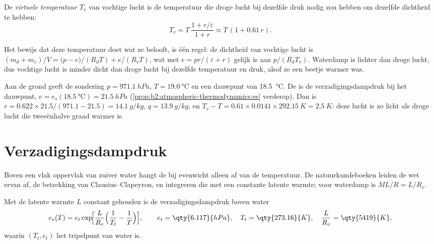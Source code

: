 \begin{definition}\label{def:b2:atmospheric-thermodynamics:virtual}
De \emph{virtuele temperatuur} $T_v$ van vochtige lucht is de temperatuur
die droge lucht bij dezelfde druk nodig zou hebben om dezelfde dichtheid te hebben:
\[
  T_v = T\,\frac{1 + r/\varepsilon}{1 + r} \approx T\,(1 + 0.61\,r) .
\]
\end{definition}

Het bewijs dat deze temperatuur doet wat ze belooft, is één regel: de dichtheid van vochtige lucht is
$(m_d + m_v)/V = \bigl(p - e\bigr)/(R_dT) + e/(R_vT)$, wat met $e = pr/(\varepsilon + r)$
gelijk is aan $p/(R_dT_v)$. Waterdamp is lichter dan droge lucht, dus vochtige lucht is minder dicht dan droge
lucht bij dezelfde temperatuur en druk, alsof ze een beetje warmer was.

\begin{example}\label{ex:b2:atmospheric-thermodynamics:norman}
Aan de grond geeft de sondering $p = \qty{971.1}{hPa}$, $T = \qty{19.0}{\celsius}$ en een dauwpunt
van \qty{18.5}{\celsius}. De  is de verzadigingsdampdruk bij het
dauwpunt, $e = e_s(\qty{18.5}{\celsius}) = \qty{21.5}{hPa}$ (\cref{prop:b2:atmospheric-thermodynamics:es}
verderop). Dan is $r = 0.622 \times 21.5/(971.1 - 21.5) = \qty{14.1}{g/kg}$, $q = \qty{13.9}{g/kg}$,
en $T_v - T = 0.61 \times 0.0141 \times \qty{292.15}{K} = \qty{2.5}{K}$: deze lucht is zo licht als
droge lucht die tweeënhalve graad warmer is.
\end{example}

\section{Verzadigingsdampdruk}\label{sec:b2:atmospheric-thermodynamics:saturation}

Boven een vlak oppervlak van zuiver water hangt de  bij evenwicht alleen af van de
temperatuur. De natuurkundeboeken leiden de wet ervan af, de betrekking van Clausius--Clapeyron, en integreren die
met een constante latente warmte; voor waterdamp is $M L/R = L/R_v$.

\begin{proposition}[Verzadigingsdampdruk]\label{prop:b2:atmospheric-thermodynamics:es}
Met de latente warmte $L$ constant gehouden is de verzadigingsdampdruk boven water
\[
  e_s(T) = e_t \exp\!\Bigl[\frac{L}{R_v}\Bigl(\frac{1}{T_t} - \frac{1}{T}\Bigr)\Bigr],
  \qquad e_t = \qty{6.117}{hPa}, \quad T_t = \qty{273.16}{K}, \quad \frac{L}{R_v} =
  \qty{5419}{K},
\]
waarin $(T_t, e_t)$ het tripelpunt van water is.
\end{proposition}


